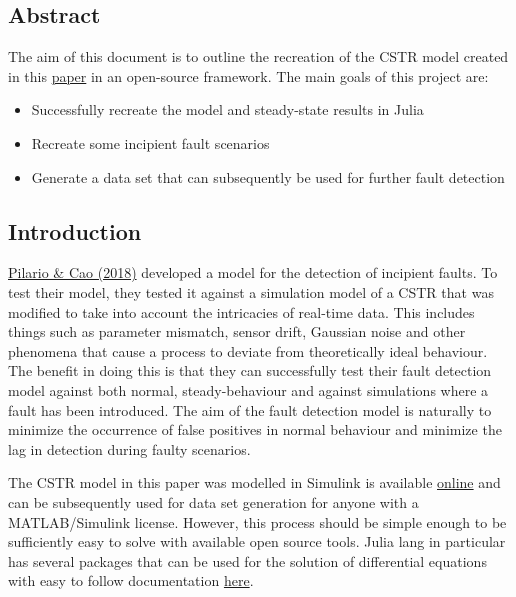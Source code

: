 \documentclass{article}
\begin{document}
\subsection{Abstract}	
The aim of this document is to outline the recreation of the CSTR model created in this \href{}{paper} in an open-source framework. The main goals of this project are:
\begin{itemize}
	\item Successfully recreate the model and steady-state results in Julia
	\item Recreate some incipient fault scenarios
	\item Generate a data set that can subsequently be used for further fault detection
\end{itemize}

\subsection{Introduction}

\href{https://dspace.lib.cranfield.ac.uk/bitstream/handle/1826/13055/Canonical_variate_dissimilarity_analysis-2018.pdf?sequence=4}{Pilario \& Cao (2018)} developed a model for the detection of incipient faults. To test their model, they tested it against a simulation model of a CSTR that was modified to take into account the intricacies of real-time data. This includes things such as parameter mismatch, sensor drift, Gaussian noise and other phenomena that cause a process to deviate from theoretically ideal behaviour. The benefit in doing this is that they can successfully test their fault detection model against both normal, steady-behaviour and against simulations where a fault has been introduced. The aim of the fault detection model is naturally to minimize the occurrence of false positives in normal behaviour and minimize the lag in detection during faulty scenarios. 

The CSTR model in this paper was modelled in Simulink is available \href{https://uk.mathworks.com/matlabcentral/fileexchange/66189-feedback-controlled-cstr-process-for-fault-simulation}{online} and can be subsequently used for data set generation for anyone with a MATLAB/Simulink license. However, this process should be simple enough to be sufficiently easy to solve with available open source tools. Julia lang in particular has several packages that can be used for the solution of differential equations with easy to follow documentation \href{https://diffeq.sciml.ai/stable/}{here}. 
\end{document}

